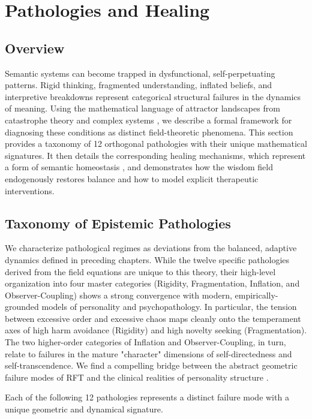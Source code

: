 \chapter{Pathologies and Healing}

\section{Overview}

Semantic systems can become trapped in dysfunctional, self-perpetuating patterns. Rigid thinking, fragmented understanding, inflated beliefs, and interpretive breakdowns represent categorical structural failures in the dynamics of meaning. Using the mathematical language of attractor landscapes from catastrophe theory and complex systems \autocite{Thom1975, Zeeman1977, Milnor1985}, we describe a formal framework for diagnosing these conditions as distinct field-theoretic phenomena. This section provides a taxonomy of 12 orthogonal pathologies with their unique mathematical signatures. It then details the corresponding healing mechanisms, which represent a form of semantic homeostasis \autocite{Cannon1932}, and demonstrates how the wisdom field endogenously restores balance and how to model explicit therapeutic interventions.

\section{Taxonomy of Epistemic Pathologies}

We characterize pathological regimes as deviations from the balanced, adaptive dynamics defined in preceding chapters. While the twelve specific pathologies derived from the field equations are unique to this theory, their high-level organization into four master categories (Rigidity, Fragmentation, Inflation, and Observer-Coupling) shows a strong convergence with modern, empirically-grounded models of personality and psychopathology. In particular, the tension between excessive order and excessive chaos maps cleanly onto the temperament axes of high harm avoidance (Rigidity) and high novelty seeking (Fragmentation). The two higher-order categories of Inflation and Observer-Coupling, in turn, relate to failures in the mature "character" dimensions of self-directedness and self-transcendence. We find a compelling bridge between the abstract geometric failure modes of RFT and the clinical realities of personality structure \autocite{Cloninger1993}.

Each of the following 12 pathologies represents a distinct failure mode with a unique geometric and dynamical signature.

